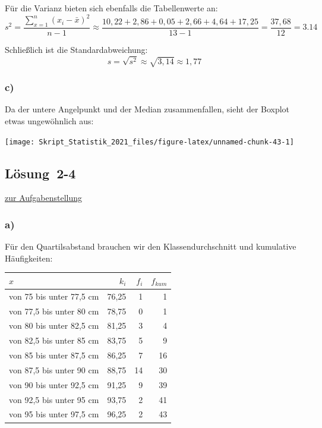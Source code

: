 \documentclass[
  11pt,
  ngerman,
  a4paper,
]{report}
\begin{document}
Für die Varianz bieten sich ebenfalls die Tabellenwerte an: \[s^2=\frac{\sum\limits_{x=1}^n(x_i-\bar{x})^2}{n-1}\approx\frac{10,22+ 2,86+ 0,05+ 2,66+ 4,64+17,25}{13-1}=\frac{37,68}{12}=3.14\]

Schließlich ist die Standardabweichung: \[s=\sqrt{s^2}\approx\sqrt{3,14}\approx1,77\]

\hypertarget{c-4}{%
\subsubsection{c)}\label{c-4}}

Da der untere Angelpunkt und der Median zusammenfallen, sieht der Boxplot etwas ungewöhnlich aus:

\begin{center}\texttt{[image: Skript\_Statistik\_2021\_files/figure-latex/unnamed-chunk-43-1]} \end{center}

\hypertarget{loesung-2-4}{%
\subsection{Lösung~2-4}\label{loesung-2-4}}

\protect\hyperlink{aufgabe-2-4}{zur Aufgabenstellung}

\hypertarget{a-5}{%
\subsubsection{a)}\label{a-5}}

Für den Quartilsabstand brauchen wir den Klassendurchschnitt und kumulative Häufigkeiten:

\begin{table}[H]
\centering
\begin{tabular}{lrrr}
\toprule
\textbf{$x$} & \textbf{$k_i$} & \textbf{$f_i$} & \textbf{$f_{kum}$}\\
\midrule
von 75 bis unter 77,5 cm & 76,25 & 1 & 1\\
von 77,5 bis unter 80 cm & 78,75 & 0 & 1\\
von 80 bis unter 82,5 cm & 81,25 & 3 & 4\\
von 82,5 bis unter 85 cm & 83,75 & 5 & 9\\
von 85 bis unter 87,5 cm & 86,25 & 7 & 16\\
von 87,5 bis unter 90 cm & 88,75 & 14 & 30\\
von 90 bis unter 92,5 cm & 91,25 & 9 & 39\\
von 92,5 bis unter 95 cm & 93,75 & 2 & 41\\
von 95 bis unter 97,5 cm & 96,25 & 2 & 43\\
\bottomrule
\end{tabular}
\end{table}
\end{document}
